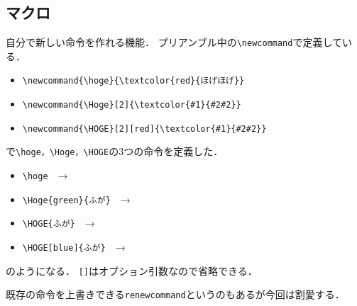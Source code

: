 \subsection{マクロ}
自分で新しい命令を作れる機能．
プリアンブル中の\verb+\newcommand+で定義している．

\begin{itemize}
 \item \verb+\newcommand{\hoge}{\textcolor{red}{ほげほげ}}+
 \item \verb+\newcommand{\Hoge}[2]{\textcolor{#1}{#2#2}}+
 \item \verb+\newcommand{\HOGE}[2][red]{\textcolor{#1}{#2#2}}+
\end{itemize}
で\verb+\hoge，\Hoge，\HOGE+の3つの命令を定義した．
\begin{itemize}
 \item \verb+\hoge+　→　\hoge
 \item \verb+\Hoge{green}{ふが}+　→　
 \item \verb+\HOGE{ふが}+　→　
 \item \verb+\HOGE[blue]{ふが}+　→　
\end{itemize}
のようになる．
\verb+[]+はオプション引数なので省略できる．

既存の命令を上書きできる\verb+renewcommand+というのもあるが今回は割愛する．

